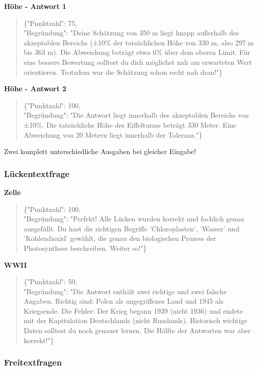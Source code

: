 \documentclass[a4paper,12pt]{article}
\begin{document}
\textbf{Höhe - Antwort 1}
\begin{quote}
\{"Punktzahl": 75,\\
"Begründung": "Deine Schätzung von 350 m liegt knapp außerhalb des akzeptablen Bereichs (±10\% der tatsächlichen Höhe von 330 m, also 297 m bis 363 m). Die Abweichung beträgt etwa 6\% über dem oberen Limit. Für eine bessere Bewertung solltest du dich möglichst nah am erwarteten Wert orientieren. Trotzdem war die Schätzung schon recht nah dran!"\}
\end{quote}

\textbf{Höhe - Antwort 2}
\begin{quote}
\{"Punktzahl": 100,\\
"Begründung": "Die Antwort liegt innerhalb des akzeptablen Bereichs von ±10\%. Die tatsächliche Höhe des Eiffelturms beträgt 330 Meter. Eine Abweichung von 20 Metern liegt innerhalb der Toleranz."\}
\end{quote}

Zwei komplett unterschiedliche Ausgaben bei gleicher Eingabe!

\subsubsection{Lückentextfrage}

\textbf{Zelle}
\begin{quote}
\{"Punktzahl": 100,\\
"Begründung": "Perfekt! Alle Lücken wurden korrekt und fachlich genau ausgefüllt. Du hast die richtigen Begriffe 'Chloroplasten', 'Wasser' und 'Kohlendioxid' gewählt, die genau den biologischen Prozess der Photosynthese beschreiben. Weiter so!"\}
\end{quote}

\textbf{WWII}
\begin{quote}
\{"Punktzahl": 50,\\
"Begründung": "Die Antwort enthält zwei richtige und zwei falsche Angaben. Richtig sind: Polen als angegriffenes Land und 1945 als Kriegsende. Die Fehler: Der Krieg begann 1939 (nicht 1936) und endete mit der Kapitulation Deutschlands (nicht Russlands). Historisch wichtige Daten solltest du noch genauer lernen. Die Hälfte der Antworten war aber korrekt!"\}
\end{quote}

\subsubsection{Freitextfragen}
\end{document}
